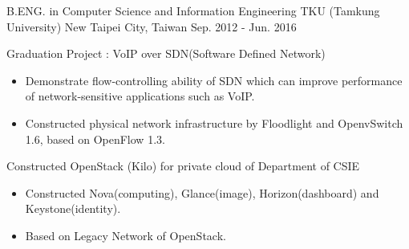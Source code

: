 \begin{cventries}
    \cventry
        {B.ENG. in Computer Science and Information Engineering}
        {TKU (Tamkung University)}
        {New Taipei City, Taiwan}
        {Sep. 2012 - Jun. 2016}
        {
            \begin{cvitems}
                \item 
                    {
                        Graduation Project : VoIP over SDN(Software Defined Network)
                        \begin{itemize}
                            \item Demonstrate flow-controlling ability of SDN which can improve performance of network-sensitive applications such as VoIP.
                            \item Constructed physical network infrastructure by Floodlight and OpenvSwitch 1.6, based on OpenFlow 1.3.
                        \end{itemize}
                    }
                \item
                    {
                        Constructed OpenStack (Kilo) for private cloud of Department of CSIE
                        \begin{itemize}
                            \item Constructed Nova(computing), Glance(image), Horizon(dashboard) and Keystone(identity).
                            \item Based on Legacy Network of OpenStack.
                        \end{itemize}
                    }
            \end{cvitems}
        }
    


\end{cventries}

